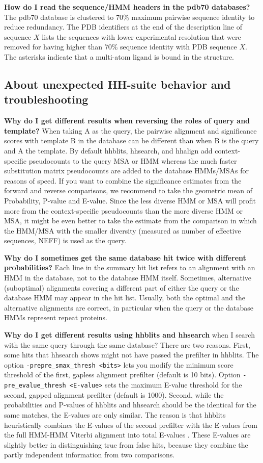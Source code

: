 \documentclass[11pt,a4paper]{article}
\begin{document}
{\bf How do I read the sequence/HMM headers in the pdb70 databases?}
The pdb70 database is clustered to 70\% maximum pairwise sequence identity to reduce redundancy. The PDB identifiers at the end of the description line of sequence $X$ lists the sequences with lower experimental resolution that were removed for having higher than 70\% sequence identity with PDB sequence $X$. The asterisks indicate that a multi-atom ligand is bound in the structure. 


\subsection{About unexpected HH-suite behavior and troubleshooting}

{\bf Why do I get different results when reversing the roles of query and template?} When taking A as the query, the pairwise alignment and significance scores with template B in the database can be different than when B is the query and A the template. By default hhblits, hhsearch, and hhalign add context-specific pseudocounts to the query MSA or HMM whereas the much faster substitution matrix pseudocounts are added to the database HMMs/MSAs for reasons of speed. If you want to combine the significance estimates from the forward and reverse comparisons, we recommend to take the geometric mean of Probability, P-value and E-value. Since the less diverse HMM or MSA will profit more from the context-specific pseudocounts than the more diverse HMM or MSA, it might be even better to take the estimate from the comparison in which the HMM/MSA with the smaller diversity (measured as number of effective sequences, NEFF) is used as the query. 

{\bf Why do I sometimes get the same database hit twice with different probabilities?} Each line in the summary hit list refers to an alignment with an HMM in the database, not to the database HMM itself. Sometimes, alternative (suboptimal) alignments covering a different part of either the query or the database HMM may appear in the hit list. Usually, both the optimal and the alternative alignments are correct, in particular when the query or the database HMMs represent repeat proteins. 

{\bf Why do I get different results using hhblits and hhsearch} when I search with the same query through the same database? There are two reasons. First, some hits that hhsearch shows might not have passed the prefilter in hhblits. The option \verb`-prepre_smax_thresh <bits>` lets you modify the minimum score threshold of the first, gapless alignment prefilter (default is 10 bits). Option \verb`-pre_evalue_thresh <E-value>` sets the maximum E-value threshold for the second, gapped alignment prefilter (default is 1000). Second, while the probabilities and P-values of hhblits and hhsearch should be the identical for the same matches, the E-values are only similar. The reason is that hhblits heuristically combines the E-values of the second prefilter with the E-values from the full HMM-HMM Viterbi alignment into total E-values \cite{Remmert:2011}. These E-values are slightly better in distinguishing true from false hits, because they combine the partly independent information from two comparisons.
\end{document}
